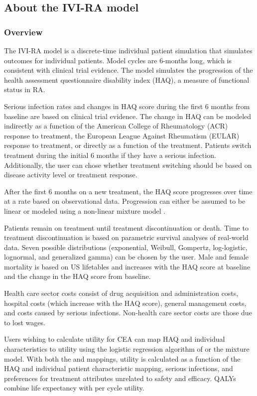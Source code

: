 \documentclass[11pt,final,fleqn]{article}
\theoremstyle{plain}
\begin{document}
\subsection*{About the IVI-RA model}
\subsubsection*{Overview}
The IVI-RA model is a discrete-time individual patient simulation that simulates outcomes for individual patients. Model cycles are 6-months long, which is consistent with clinical trial evidence. The model simulates the progression of the health assessment questionnaire disability index (HAQ), a measure of functional status in RA. 

Serious infection rates and changes in HAQ score during the first 6 months from baseline are based on clinical trial evidence. The change in HAQ can be modeled indirectly as a function of the American College of Rheumatology (ACR) response to treatment, the European League Against Rheumatism (EULAR) response to treatment, or directly as a function of the treatment. Patients switch treatment during the initial 6 months if they have a serious infection. Additionally, the user can chose whether treatment switching should be based on disease activity level or treatment response. 

After the first 6 months on a new treatment, the HAQ score progresses over time at a rate based on observational data. Progression can either be assumed to be linear \citep{wolfe2010loss, michaud2011treatment} or modeled using a non-linear mixture model \citep{norton2014health}. 

Patients remain on treatment until treatment discontinuation or death. Time to treatment discontinuation is based on parametric survival analyses of real-world data. Seven possible distributions (exponential, Weibull, Gompertz, log-logistic, lognormal, and generalized gamma) can be chosen by the user. Male and female mortality is based on US lifetables and increases with the HAQ score at baseline and the change in the HAQ score from baseline. 

Health care sector costs consist of drug acquisition and administration costs, hospital costs (which increase with the HAQ score), general management costs, and costs caused by serious infections. Non-health care sector costs are those due to lost wages.

Users wishing to calculate utility for CEA can map HAQ and individual characteristics to utility using the logistic regression algorithm of \citet{wailoo2006modeling} or the \citet{alava2013relationship} mixture model. With both the \citet{wailoo2006modeling} and \citet{wailoo2006modeling} mappings, utility  is calculated as a function of the HAQ and individual patient characteristic mapping, serious infections, and preferences for treatment attributes unrelated to safety and efficacy. QALYs combine life expectancy with per cycle utility.  
\end{document}

